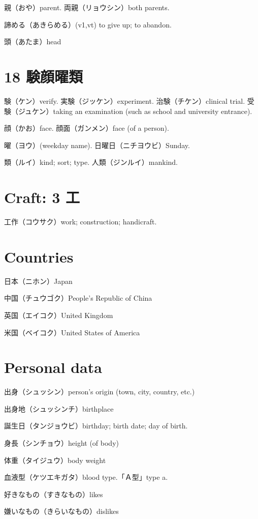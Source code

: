 親（おや）parent.
両親（リョウシン）both parents.

諦める（あきらめる）(v1,vt)
to give up; to abandon.

頭（あたま）head

\section{18 験顔曜類}

験（ケン）verify.
実験（ジッケン）experiment.
治験（チケン）clinical trial.
受験（ジュケン）taking an examination (such as school and university entrance).

顔（かお）face.
顔面（ガンメン）face (of a person).

曜（ヨウ）(weekday name).
日曜日（ニチヨウビ）Sunday.

類（ルイ）kind; sort; type.
人類（ジンルイ）mankind.

\section{Craft: 3 工}

工作（コウサク）work; construction; handicraft.

\section{Countries}

日本（ニホン）Japan

中国（チュウゴク）People's Republic of China

英国（エイコク）United Kingdom

米国（ベイコク）United States of America

\section{Personal data}

出身（シュッシン）person's origin (town, city, country, etc.)

出身地（シュッシンチ）birthplace

誕生日（タンジョウビ）birthday; birth date; day of birth.

身長（シンチョウ）height (of body)

体重（タイジュウ）body weight

血液型（ケツエキガタ）blood type.「Ａ型」type a.

好きなもの（すきなもの）likes

嫌いなもの（きらいなもの）dislikes

